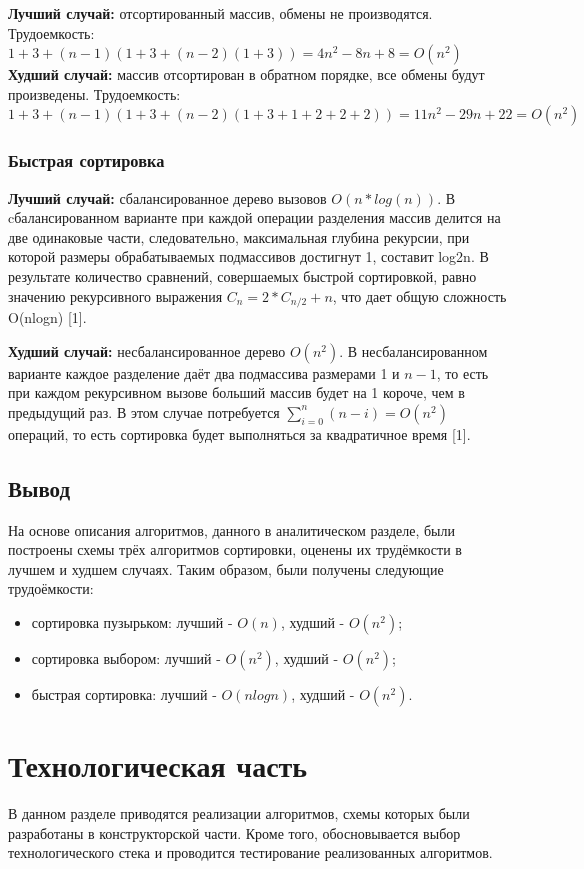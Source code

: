 \documentclass[12pt]{report}
\begin{document}
\textbf{Лучший случай:} отсортированный массив, обмены не производятся.
\newline
Трудоемкость: $1 + 3 + (n - 1)(1 + 3 + (n - 2)(1 + 3)) = 4n^2 - 8n + 8 = O(n^2)$
\newline
\hspace*{5mm}
\textbf{Худший случай:} массив отсортирован в обратном порядке, все обмены будут произведены. \newline
Трудоемкость: $1 + 3 + (n - 1)(1 + 3 + (n - 2)(1 + 3 + 1 + 2 + 2 + 2)) = 11n^2 - 29n + 22 = O(n^2)$

\subsection{Быстрая сортировка}
\textbf{Лучший случай:} сбалансированное дерево вызовов \(O(n*log(n))\). 
В cбалансированном варианте при каждой операции разделения массив делится на две одинаковые части, следовательно, максимальная глубина рекурсии, при которой размеры обрабатываемых подмассивов достигнут 1, составит log2n. В результате количество сравнений, совершаемых быстрой сортировкой, равно значению рекурсивного выражения $C_n = 2 * C_{n / 2} + n$, что дает общую сложность O(nlogn) [1].

\textbf{Худший случай:} несбалансированное дерево $O(n^2)$.
В несбалансированном варианте каждое разделение даёт два подмассива размерами 1 и $n - 1$, то есть при каждом рекурсивном вызове больший массив будет на 1 короче, чем в предыдущий раз. В этом случае потребуется $\sum_{{i=0}}^{n}(n-i)=O(n^{2})$ операций, то есть сортировка будет выполняться за квадратичное время [1].

\newpage
\section{Вывод}
На основе описания алгоритмов, данного в аналитическом разделе, были построены схемы трёх алгоритмов сортировки, оценены их трудёмкости в лучшем и худшем случаях. Таким образом, были получены следующие трудоёмкости:
\begin{itemize}
\item сортировка пузырьком: лучший - $O(n)$, худший - $O(n^2)$;
\item сортировка выбором: лучший - $O(n^2)$, худший - $O(n^2)$;
\item быстрая сортировка: лучший - $O(nlogn)$, худший - $O(n^2)$.
\end{itemize}

\newpage
\chapter{Технологическая часть}
В данном разделе приводятся реализации алгоритмов, схемы которых были разработаны в конструкторской части. Кроме того, обосновывается выбор технологического стека и проводится тестирование реализованных алгоритмов.
\end{document}
